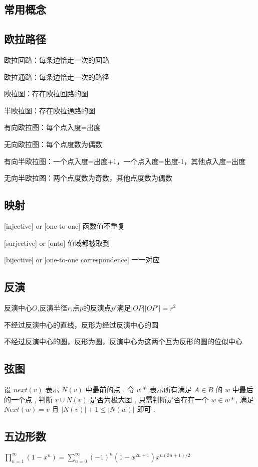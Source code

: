 \subsection{常用概念}

\subsection{欧拉路径}
	欧拉回路：每条边恰走一次的回路\par
	欧拉通路：每条边恰走一次的路径\par
	欧拉图：存在欧拉回路的图\par
	半欧拉图：存在欧拉通路的图\par
	有向欧拉图：每个点入度=出度\par
	无向欧拉图：每个点度数为偶数\par
	有向半欧拉图：一个点入度=出度+1，一个点入度=出度-1，其他点入度=出度\par
	无向半欧拉图：两个点度数为奇数，其他点度数为偶数\par

\subsection{映射}
[injective] or [one-to-one] 函数值不重复 \par {[}surjective] or [onto] 值域都被取到 \par {[}bijective] or [one-to-one correspondence] 一一对应

\subsection{反演}
反演中心$O$,反演半径$r$,点$p$的反演点$p'$满足$|OP||OP'|=r^2$\par
不经过反演中心的直线，反形为经过反演中心的圆\par
不经过反演中心的圆，反形为圆，反演中心为这两个互为反形的圆的位似中心\par

\subsection{弦图}
设 $next(v)$ 表示 $N(v)$ 中最前的点 . 
令 $w*$ 表示所有满足 $A \in B$ 的 $w$ 中最后的一个点 , 
判断 $v \cup N(v)$ 是否为极大团 , 
只需判断是否存在一个 $w \in w*$, 
满足 $Next(w)=v$ 且 $|N(v)| + 1 \leq |N(w)|$ 即可 . 

\subsection{五边形数}
$\prod_{n=1}^{\infty}{(1-x^{n})}=\sum_{n=0}^{\infty}{(-1)^{n}(1-x^{2n+1})x^{n(3n+1)/2}}$

